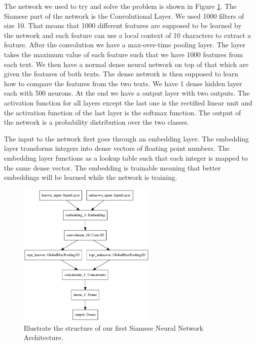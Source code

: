 The network we used to try and solve the problem is shown in Figure
\ref{fig:network_1}. The Siamese part of the network is the Convolutional
Layer. We used 1000 filters of size 10. That means that 1000 different features
are supposed to be learned by the network and each feature can use a local
context of 10 characters to extract a feature. After the convolution we have a
max-over-time pooling layer. The layer takes the maximum value of each feature
such that we have 1000 features from each text. We then have a normal dense
neural network on top of that which are given the features of both texts. The
dense network is then supposed to learn how to compare the features from the two
texts. We have 1 dense hidden layer each with 500 neurons. At the end we have
a output layer with two outputs. The activation function for all layers except
the last one is the rectified linear unit and the activation function of the
last layer is the softmax function. The output of the network is a probability
distribution over the two classes.

The input to the network first goes through an embedding layer. The embedding
layer transforms integers into dense vectors of floating point numbers. The
embedding layer functions as a lookup table such that each integer is mapped
to the same dense vector. The embedding is trainable meaning that better
embeddings will be learned while the network is training.

\begin{figure}[htb]
    \centering
    \includegraphics[width=0.6\textwidth]{./pictures/experiments/network1.png}
    \caption{Illustrate the structure of our first Siamese Neural Network
        Architecture.}
    \label{fig:network_1}
\end{figure}

